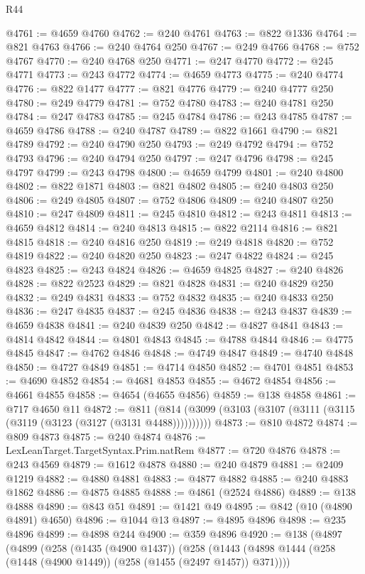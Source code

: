 \begin{lexlean}{R44}
\begin{coremodule}
{@4761 := @4659 @4760
@4762 := @240 @4761
@4763 := @822 @1336
@4764 := @821 @4763
@4766 := @240 @4764 @250
@4767 := @249 @4766
@4768 := @752 @4767
@4770 := @240 @4768 @250
@4771 := @247 @4770
@4772 := @245 @4771
@4773 := @243 @4772
@4774 := @4659 @4773
@4775 := @240 @4774
@4776 := @822 @1477
@4777 := @821 @4776
@4779 := @240 @4777 @250
@4780 := @249 @4779
@4781 := @752 @4780
@4783 := @240 @4781 @250
@4784 := @247 @4783
@4785 := @245 @4784
@4786 := @243 @4785
@4787 := @4659 @4786
@4788 := @240 @4787
@4789 := @822 @1661
@4790 := @821 @4789
@4792 := @240 @4790 @250
@4793 := @249 @4792
@4794 := @752 @4793
@4796 := @240 @4794 @250
@4797 := @247 @4796
@4798 := @245 @4797
@4799 := @243 @4798
@4800 := @4659 @4799
@4801 := @240 @4800
@4802 := @822 @1871
@4803 := @821 @4802
@4805 := @240 @4803 @250
@4806 := @249 @4805
@4807 := @752 @4806
@4809 := @240 @4807 @250
@4810 := @247 @4809
@4811 := @245 @4810
@4812 := @243 @4811
@4813 := @4659 @4812
@4814 := @240 @4813
@4815 := @822 @2114
@4816 := @821 @4815
@4818 := @240 @4816 @250
@4819 := @249 @4818
@4820 := @752 @4819
@4822 := @240 @4820 @250
@4823 := @247 @4822
@4824 := @245 @4823
@4825 := @243 @4824
@4826 := @4659 @4825
@4827 := @240 @4826
@4828 := @822 @2523
@4829 := @821 @4828
@4831 := @240 @4829 @250
@4832 := @249 @4831
@4833 := @752 @4832
@4835 := @240 @4833 @250
@4836 := @247 @4835
@4837 := @245 @4836
@4838 := @243 @4837
@4839 := @4659 @4838
@4841 := @240 @4839 @250
@4842 := @4827 @4841
@4843 := @4814 @4842
@4844 := @4801 @4843
@4845 := @4788 @4844
@4846 := @4775 @4845
@4847 := @4762 @4846
@4848 := @4749 @4847
@4849 := @4740 @4848
@4850 := @4727 @4849
@4851 := @4714 @4850
@4852 := @4701 @4851
@4853 := @4690 @4852
@4854 := @4681 @4853
@4855 := @4672 @4854
@4856 := @4661 @4855
@4858 := @4654 (@4655 @4856)
@4859 := @138 @4858
@4861 := @717 @4650 @11
@4872 := @811 (@814 (@3099 (@3103 (@3107 (@3111 (@3115 (@3119 (@3123 (@3127 (@3131 @4488))))))))))
@4873 := @810 @4872
@4874 := @809 @4873
@4875 := @240 @4874
@4876 := LexLeanTarget.TargetSyntax.Prim.natRem
@4877 := @720 @4876
@4878 := @243 @4569
@4879 := @1612 @4878
@4880 := @240 @4879
@4881 := @2409 @1219
@4882 := @4880 @4881
@4883 := @4877 @4882
@4885 := @240 @4883 @1862
@4886 := @4875 @4885
@4888 := @4861 (@2524 @4886)
@4889 := @138 @4888
@4890 := @843 @51
@4891 := @1421 @49
@4895 := @842 (@10 (@4890 @4891) @4650)
@4896 := @1044 @13
@4897 := @4895 @4896
@4898 := @235 @4896
@4899 := @4898 @244
@4900 := @359 @4896
@4920 := @138
    (@4897
      (@4899
        (@258
          (@1435 (@4900 @1437))
          (@258
            (@1443 (@4898 @1444 (@258 (@1448 (@4900 @1449)) (@258 (@1455 (@2497 @1457)) @371))))
}
\end{coremodule}
\end{lexlean}
